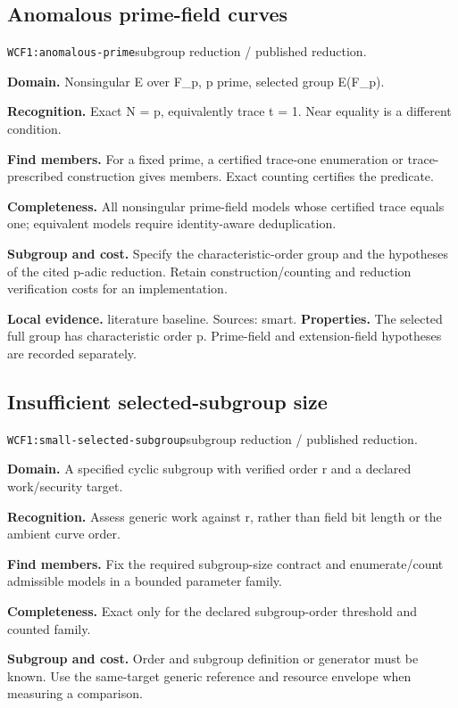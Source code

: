 \documentclass[10pt]{article}
\begin{document}
\subsection{Anomalous prime-field curves}
\texttt{WCF1:anomalous-prime}\quad subgroup reduction / published reduction.\par
\textbf{Domain.} Nonsingular E over F\_p, p prime, selected group E(F\_p).\par
\textbf{Recognition.} Exact N = p, equivalently trace t = 1. Near equality is a different condition.\par
\textbf{Find members.} For a fixed prime, a certified trace-one enumeration or trace-prescribed construction gives members. Exact counting certifies the predicate.\par
\textbf{Completeness.} All nonsingular prime-field models whose certified trace equals one; equivalent models require identity-aware deduplication.\par
\textbf{Subgroup and cost.} Specify the characteristic-order group and the hypotheses of the cited p-adic reduction. Retain construction/counting and reduction verification costs for an implementation.\par
\textbf{Local evidence.} literature baseline. Sources: smart.
\textbf{Properties.} The selected full group has characteristic order p. Prime-field and extension-field hypotheses are recorded separately.\par
{}\subsection{Insufficient selected-subgroup size}
\texttt{WCF1:small-selected-subgroup}\quad subgroup reduction / published reduction.\par
\textbf{Domain.} A specified cyclic subgroup with verified order r and a declared work/security target.\par
\textbf{Recognition.} Assess generic work against r, rather than field bit length or the ambient curve order.\par
\textbf{Find members.} Fix the required subgroup-size contract and enumerate/count admissible models in a bounded parameter family.\par
\textbf{Completeness.} Exact only for the declared subgroup-order threshold and counted family.\par
\textbf{Subgroup and cost.} Order and subgroup definition or generator must be known. Use the same-target generic reference and resource envelope when measuring a comparison.\par
\end{document}
